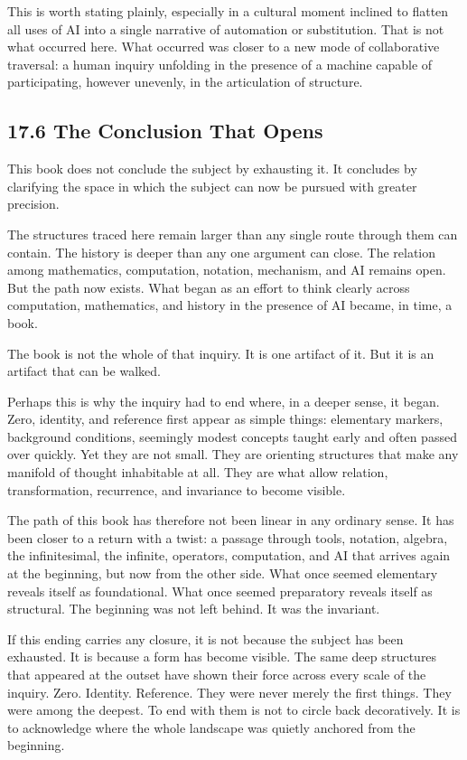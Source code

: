 \documentclass[
]{article}
\begin{document}
This is worth stating plainly, especially in a cultural moment inclined
to flatten all uses of AI into a single narrative of automation or
substitution. That is not what occurred here. What occurred was closer
to a new mode of collaborative traversal: a human inquiry unfolding in
the presence of a machine capable of participating, however unevenly, in
the articulation of structure.

\hypertarget{the-conclusion-that-opens}{%
\subsection{17.6 The Conclusion That
Opens}\label{the-conclusion-that-opens}}

This book does not conclude the subject by exhausting it. It concludes
by clarifying the space in which the subject can now be pursued with
greater precision.

The structures traced here remain larger than any single route through
them can contain. The history is deeper than any one argument can close.
The relation among mathematics, computation, notation, mechanism, and AI
remains open. But the path now exists. What began as an effort to think
clearly across computation, mathematics, and history in the presence of
AI became, in time, a book.

The book is not the whole of that inquiry. It is one artifact of it. But
it is an artifact that can be walked.

Perhaps this is why the inquiry had to end where, in a deeper sense, it
began. Zero, identity, and reference first appear as simple things:
elementary markers, background conditions, seemingly modest concepts
taught early and often passed over quickly. Yet they are not small. They
are orienting structures that make any manifold of thought inhabitable
at all. They are what allow relation, transformation, recurrence, and
invariance to become visible.

The path of this book has therefore not been linear in any ordinary
sense. It has been closer to a return with a twist: a passage through
tools, notation, algebra, the infinitesimal, the infinite, operators,
computation, and AI that arrives again at the beginning, but now from
the other side. What once seemed elementary reveals itself as
foundational. What once seemed preparatory reveals itself as structural.
The beginning was not left behind. It was the invariant.

If this ending carries any closure, it is not because the subject has
been exhausted. It is because a form has become visible. The same deep
structures that appeared at the outset have shown their force across
every scale of the inquiry. Zero. Identity. Reference. They were never
merely the first things. They were among the deepest. To end with them
is not to circle back decoratively. It is to acknowledge where the whole
landscape was quietly anchored from the beginning.
\end{document}
